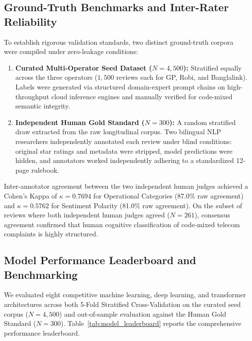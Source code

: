 \documentclass[5p,twocolumn,authoryear]{elsarticle}
\begin{document}
\subsection{Ground-Truth Benchmarks and Inter-Rater Reliability}
To establish rigorous validation standards, two distinct ground-truth corpora were compiled under zero-leakage conditions:
\begin{enumerate}
    \item \textbf{Curated Multi-Operator Seed Dataset ($N = 4{,}500$):} Stratified equally across the three operators ($1{,}500$ reviews each for GP, Robi, and Banglalink). Labels were generated via structured domain-expert prompt chains on high-throughput cloud inference engines and manually verified for code-mixed semantic integrity.
    \item \textbf{Independent Human Gold Standard ($N = 300$):} A random stratified draw extracted from the raw longitudinal corpus. Two bilingual NLP researchers independently annotated each review under blind conditions: original star ratings and metadata were stripped, model predictions were hidden, and annotators worked independently adhering to a standardized 12-page rulebook.
\end{enumerate}

Inter-annotator agreement between the two independent human judges achieved a Cohen's Kappa \citep{cohen1960coefficient} of $\kappa = 0.7694$ for Operational Categories (87.0\% raw agreement) and $\kappa = 0.5762$ for Sentiment Polarity (81.0\% raw agreement). On the subset of reviews where both independent human judges agreed ($N = 261$), consensus agreement confirmed that human cognitive classification of code-mixed telecom complaints is highly structured.

\subsection{Model Performance Leaderboard and Benchmarking}
We evaluated eight competitive machine learning, deep learning, and transformer architectures across both 5-Fold Stratified Cross-Validation on the curated seed corpus ($N = 4{,}500$) and out-of-sample evaluation against the Human Gold Standard ($N = 300$). Table~\ref{tab:model_leaderboard} reports the comprehensive performance leaderboard.
\end{document}
